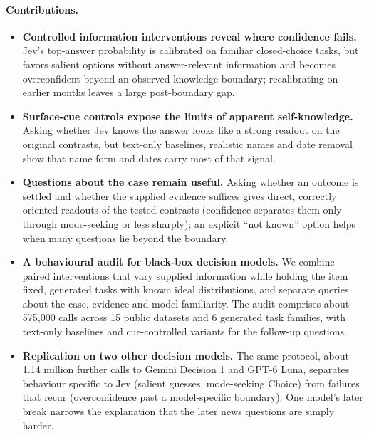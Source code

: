 \documentclass[10pt,twocolumn]{article}
\begin{document}
\paragraph{Contributions.}
\begin{itemize}[leftmargin=*,itemsep=1pt,topsep=2pt]
\item \textbf{Controlled information interventions reveal where confidence
  fails.} Jev's top-answer probability is calibrated on familiar closed-choice
  tasks, but favors salient options without answer-relevant information and
  becomes overconfident beyond an observed knowledge boundary; recalibrating
  on earlier months leaves a large post-boundary gap.

\item \textbf{Surface-cue controls expose the limits of apparent
  self-knowledge.} Asking whether Jev knows the answer looks like a strong
  readout on the original contrasts, but text-only baselines, realistic names
  and date removal show that name form and dates carry most of that signal.

\item \textbf{Questions about the case remain useful.} Asking whether an
  outcome is settled and whether the supplied evidence suffices gives direct,
  correctly oriented readouts of the tested contrasts (confidence separates
  them only through mode-seeking or less sharply); an explicit ``not known''
  option helps when many questions lie beyond the boundary.

\item \textbf{A behavioural audit for black-box decision models.}
  We combine paired interventions that vary supplied information while
  holding the item fixed, generated tasks with known ideal distributions,
  and separate queries about the case, evidence and model familiarity. The
  audit comprises about 575{,}000 calls across 15 public datasets and 6
  generated task families, with text-only baselines and cue-controlled
  variants for the follow-up questions.

\item \textbf{Replication on two other decision models.} The same protocol,
  about 1.14 million further calls to Gemini Decision 1 and GPT-6 Luna,
  separates behaviour specific to Jev (salient guesses, mode-seeking Choice)
  from failures that recur (overconfidence past a model-specific boundary).
  One model's later break narrows the explanation that the later news
  questions are simply harder.
\end{itemize}
\end{document}
